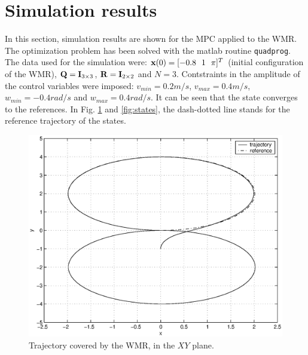 \documentclass[twocolumn]{IEEEtran} %
\begin{document}
\section{Simulation results}\label{sec:simulations}
In this section, simulation results are shown for the MPC applied to the WMR. The optimization problem has been solved with the {\sc matlab} routine {\tt quadprog}. The data used for the simulation were: ${\bf x}(0)=[-0.8~~1~~\pi]^T$ (initial configuration of the WMR), ${\bf Q}={\bf I}_{3\times 3}$, ${\bf R}={\bf I}_{2\times 2}$ and $N=3$. Contstraints in the amplitude of the control variables were imposed: $v_{min}=0.2 m/s$, $v_{max}=0.4 m/s$, $w_{min}=-0.4 rad/s$ and $w_{max}=0.4 rad/s$. It can be seen that the state converges to the references. In Fig. \ref{fig:traj8} and \ref{fig:states}, the dash-dotted line stands for the reference trajectory of the states. 
\begin{figure}\begin{center}
    \includegraphics[width=.99\linewidth]{Figures/traj8.eps}
    \caption{Trajectory covered by the WMR, in the $XY$ plane.}
    \label{fig:traj8}
\end{center}\end{figure}
\end{document}
